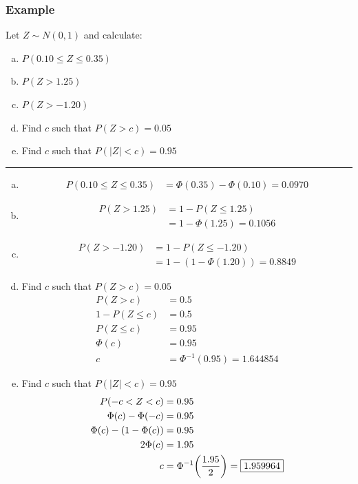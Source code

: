 \documentclass{report}
\newcommand{\ex}{\noindent\rule{\linewidth}{0.2pt}}
\DeclarePairedDelimiter\autobracket{(}{)}
\newcommand{\br}[1]{\autobracket*{#1}}
\begin{document}
\subsubsection*{Example}

Let $Z \sim N(0, 1)$ and calculate: \begin{enumerate}[(a)]
\item $P(0.10 \leq Z \leq 0.35)$
\item $P(Z > 1.25)$
\item $P(Z > -1.20)$
\item Find $c$ such that $P(Z > c) = 0.05$
\item Find $c$ such that $P(|Z| < c) = 0.95$
\end{enumerate} 

\ex

\begin{enumerate}[(a)]
\item \begin{align*}
P(0.10 \leq Z \leq 0.35) & = \Phi(0.35) - \Phi(0.10) = \boxed{0.0970}
\end{align*}
\item \begin{align*}
P(Z > 1.25) & = 1 - P(Z \leq 1.25) \\ 
& = 1 - \Phi(1.25) = \boxed{0.1056}
\end{align*}
\item  \begin{align*}
P(Z > -1.20) & = 1 - P(Z \leq -1.20) \\ 
& = 1 - (1-\Phi(1.20)) = \boxed{0.8849}
\end{align*}
\item Find $c$ such that $P(Z > c) = 0.05$ \begin{align*}
P(Z > c) & = 0.5 \\
1 - P(Z \leq c) & = 0.5 \\
 P(Z \leq c)  & = 0.95 \\
 \Phi(c) & = 0.95  \\ 
c  & = \Phi^{-1}(0.95)  = \boxed{1.644854}
\end{align*}
\item Find $c$ such that $P(|Z| < c) = 0.95$
\begin{align*}
P(-c < Z < c) & = 0.95 \\
\Phi(c) - \Phi(-c) & = 0.95 \\
\Phi(c) - (1-\Phi(c)) & = 0.95 \\
2\Phi(c) & = 1.95 \\
c & = \Phi^{-1}\br{\frac{1.95}{2}} = \boxed{1.959964}
\end{align*}
\end{enumerate} 
\end{document}
